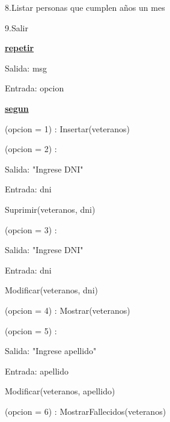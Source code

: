 \documentclass{article}
\begin{document}
        \hspace{17mm}8.Listar personas que cumplen años un mes

        \hspace{17mm}9.Salir

    \hspace{4mm}\underline{\textbf{repetir}} 

    \hspace{8mm}Salida: msg

    \hspace{8mm}Entrada: opcion

    \hspace{8mm}\underline{\textbf{segun}}

        \hspace{12mm}(opcion = 1) : Insertar(veteranos)

        \hspace{12mm}(opcion = 2) :

            \hspace{16mm}Salida: "Ingrese DNI"

            \hspace{16mm}Entrada: dni
            
            \hspace{16mm}Suprimir(veteranos, dni)

        \hspace{12mm}(opcion = 3) : 
        
            \hspace{16mm}Salida: "Ingrese DNI"

            \hspace{16mm}Entrada: dni
            
            \hspace{16mm}Modificar(veteranos, dni)

        \hspace{12mm}(opcion = 4) : Mostrar(veteranos)

        \hspace{12mm}(opcion = 5) : 
        
            \hspace{16mm}Salida: "Ingrese apellido"

            \hspace{16mm}Entrada: apellido
            
            \hspace{16mm}Modificar(veteranos, apellido)

        \hspace{12mm}(opcion = 6) : MostrarFallecidos(veteranos)
\end{document}
